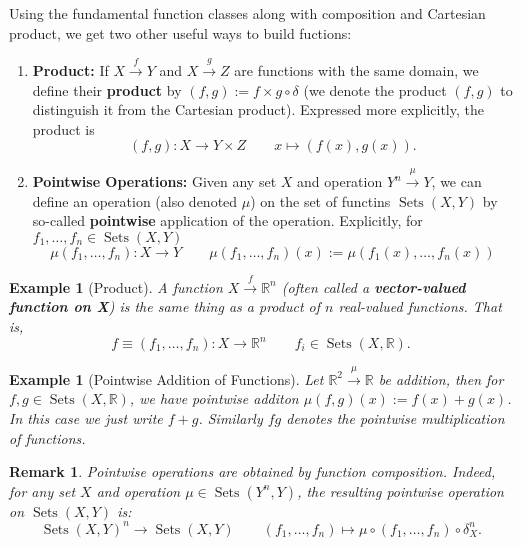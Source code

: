 \documentclass[12pt]{amsart}
\newtheorem{example}[theorem]{Example}
\newtheorem{remark}[theorem]{Remark}
\numberwithin{equation}{section}
\newcommand\Rb{{\mathbb R}} %
\newcommand{\diag}{\delta}
\newcommand{\op}{\mu}
\newcommand{\To}{\longrightarrow}
\newcommand{\mTo}{\longmapsto}
\newcommand{\Tof}[1]{\stackrel{#1}{\!\longrightarrow\!}}
\DeclareMathOperator{\Sets}{Sets}
\begin{document}
Using the fundamental function classes along with composition and Cartesian product, we get two other useful ways to build fuctions:
\begin{enumerate}
  \item \textbf{Product:} If $X\Tof{f} Y$ and $X\Tof{g} Z$ are functions with the same domain, we define their \textbf{product} by $(f,g):=f\times g \circ \delta$  (we denote the product $(f,g)$ to distinguish it from the Cartesian product).  Expressed more explicitly, the product is
 \[    (f,g):X\To Y\times Z \qquad x\mTo (f(x),g(x)). \]  
\item \textbf{Pointwise Operations:} Given any set $X$ and operation $Y^n\Tof{\mu} Y$, we can define an operation (also denoted $\mu$) on the set of functins $\Sets(X,Y)$ by so-called \textbf{pointwise} application of the operation.  Explicitly, for $f_1,\dots,f_n\in \Sets(X,Y)$ 
\[\mu(f_1,\dots,f_n):X\To Y\qquad \mu(f_1,\dots,f_n)(x):=\mu(f_1(x),\dots,f_n(x))\]
\end{enumerate}
\begin{example}[Product] A function $X\Tof{f} \Rb^n$ (often called a \textbf{vector-valued function on X}) is the same thing as a product of $n$ real-valued functions.  That is, 
\[ f\equiv (f_1,\dots,f_n):X\To \Rb^n \qquad f_i\in \Sets(X,\Rb). \]
\end{example}
\begin{example}[Pointwise Addition of Functions]
Let $\Rb^2\Tof{\mu}\Rb$ be addition, then for $f,g\in\Sets(X,\Rb)$, we have pointwise additon $\op(f,g)(x):= f(x)+g(x)$.  In this case we just write $f+g$.  Similarly $fg$ denotes the pointwise multiplication of functions. 
\end{example}


\begin{remark}Pointwise operations are obtained by function composition.  Indeed, for any set $X$ and operation $\op\in\Sets(Y^n,Y)$, the resulting pointwise operation on $\Sets(X,Y)$ is:
\[ \Sets(X,Y)^n\To\Sets(X,Y)\qquad (f_1,\dots,f_n)\mTo \op\circ(f_1,\dots,f_n)\circ\diag_X^n.\] 
\end{remark}
\end{document}
